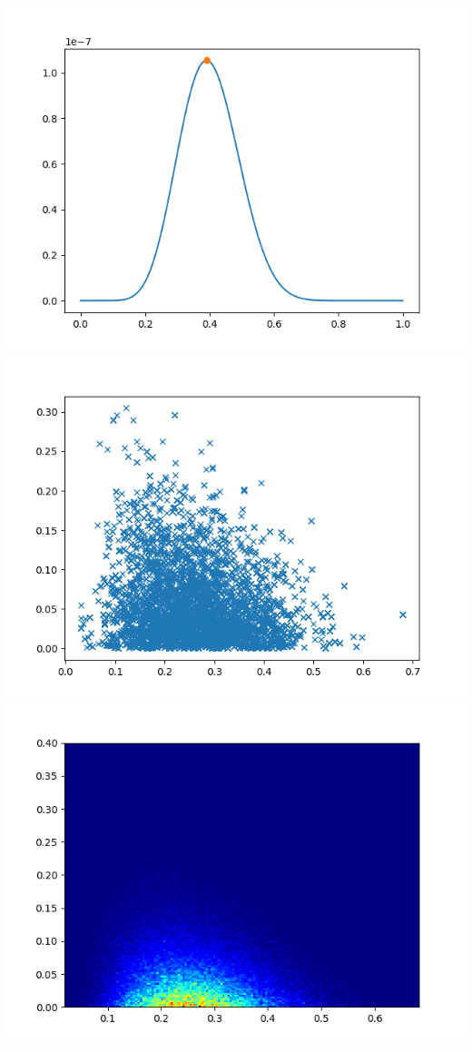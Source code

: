 \documentclass[pt12]{article}
\begin{document}
\newpage

\begin{center}
\includegraphics[scale=0.5]{hip18.png}\\
\includegraphics[scale=0.5]{sc18.png}\\
\includegraphics[scale=0.5]{den18.png}\\
\end{center}
\end{document}
